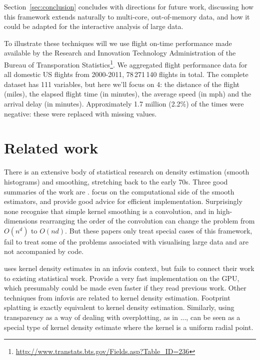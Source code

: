 \documentclass[journal]{vgtc}                %
\begin{document}
Section~\ref{sec:conclusion} concludes with directions for future work, discussing how this framework extends naturally to multi-core, out-of-memory data, and how it could be adapted for the interactive analysis of large data.

To illustrate these techniques will we use flight on-time performance made available by the Research and Innovation Technology Administration of the Bureau of Transporation Statistics\footnote{\url{http://www.transtats.bts.gov/Fields.asp?Table_ID=236}}. We aggregated flight performance data for all domestic US flights from 2000-2011, 78\,271\,140 flights in total. The complete dataset has 111 variables, but here we'll focus on 4: the distance of the flight (miles), the elapsed flight time (in minutes), the average speed (in mph) and the arrival delay (in minutes). Approximately 1.7 million (2.2\%) of the times were negative: these were replaced with missing values.

\section{Related work}
\label{sec:related-work}

There is an extensive body of statistical research on density estimation (smooth histograms) and smoothing, stretching back to the early 70s. Three good summaries of the work are \cite{scott:1992,bowman:1997,loader:1999a}.    \cite{hardle:1992,wand:1994,fan:1994} focus on the computational side of the smooth estimators, and provide good advice for efficient implementation.  Surprisingly none recognise that simple kernel smoothing is a convolution, and in high-dimensions rearranging the order of the convolution can change the problem from $O(n^d)$ to $O(nd)$. But these papers only treat special cases of this framework, fail to treat some of the problems associated with visualising large data and are not accompanied by code.

\citep{lampe:2011} uses kernel density estimates in an infovis context, but fails to connect their work to existing statistical work. Provide a very fast implementation on the GPU, which presumably could be made even faster if they read previous work. Other techniques from infovis are related to kernel density estimation. Footprint splatting \citep{becker:1997,yang:2003} is exactly equivalent to kernel density estimation. Similarly, using transparency as a way of dealing with overplotting, as in ..., can be seen as a special type of kernel density estimate where the kernel is a uniform radial point.
\end{document}
